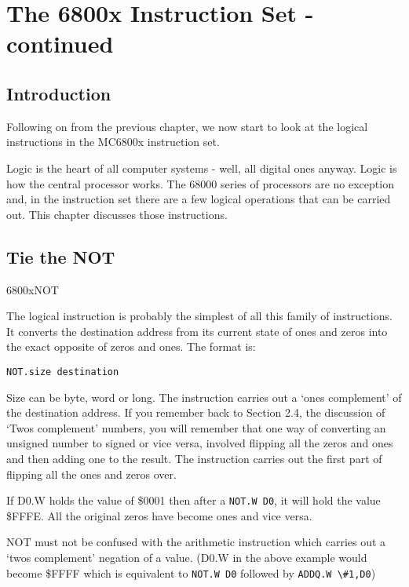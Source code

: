 
\chapter{The 6800x Instruction Set -{} continued}

\section{Introduction}
\label{ch4-intro}%

Following on from the previous chapter, we now start to look at the
    logical instructions in the MC6800x instruction set.

Logic is the heart of all computer systems -{} well, all digital ones
    anyway. Logic is how the central processor works. The 68000 series of
    processors are no exception and, in the instruction set there are a few
    logical operations that can be carried out. This chapter discusses those
    instructions.

\section{Tie the NOT}\mc6800x{NOT}
\label{ch4-Logic}%

The logical  instruction is probably the simplest of all this
    family of instructions. It converts the destination address from its
    current state of ones and zeros into the exact opposite of zeros and ones.
    The format is:

\begin{lstlisting}[firstnumber=1,]
          NOT.size destination
\end{lstlisting}

Size can be byte, word or long. The instruction carries out a `ones
    complement' of the destination address. If you remember back to Section 2.4, the 
    discussion of `Twos complement' numbers, you will
    remember that one way of converting an unsigned number to signed or vice versa,
    involved flipping
    all the zeros and ones and then adding one to the result. The 
    instruction carries out the first part of flipping all the ones and zeros
    over.

If D0.W holds the value of \$0001 then after a \lstinline{NOT.W D0}, it will hold
    the value \$FFFE. All the original zeros have become ones and vice
    versa.

NOT must not be confused with the arithmetic  instruction which
    carries out a `twos complement' negation of a value. (D0.W in the above
    example would become \$FFFF which is equivalent to \lstinline{NOT.W D0} followed by
    \lstinline{ADDQ.W \#1,D0})

